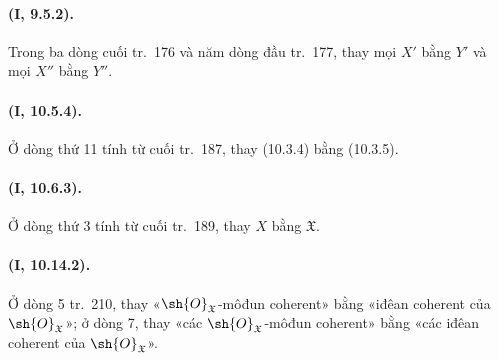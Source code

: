 \documentclass[oneside,10pt]{amsart}
\begin{document}
\paragraph{(I, 9.5.2).}
Trong ba dòng cuối tr.~176 và năm dòng đầu tr.~177, thay mọi $X'$ bằng
$Y'$ và mọi $X''$ bằng $Y''$.

\paragraph{(I, 10.5.4).}
Ở dòng thứ 11 tính từ cuối tr.~187, thay (10.3.4) bằng (10.3.5).

\paragraph{(I, 10.6.3).}
Ở dòng thứ 3 tính từ cuối tr.~189, thay $X$ bằng $\mathfrak X$.

\paragraph{(I, 10.14.2).}
Ở dòng 5 tr.~210, thay «$\sh{O}_{\mathfrak X}$-môđun coherent» bằng
«iđêan coherent của $\sh{O}_{\mathfrak X}$»; ở dòng 7, thay
«các $\sh{O}_{\mathfrak X}$-môđun coherent» bằng «các iđêan coherent
của $\sh{O}_{\mathfrak X}$».
\end{document}
